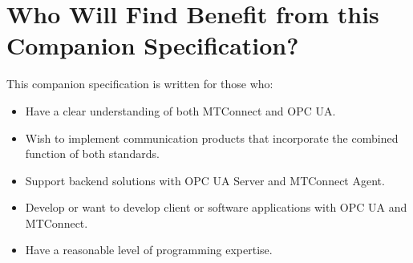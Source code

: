 \section{Who Will Find Benefit from this Companion Specification?}\label{whowillbenefit}

This companion specification is written for those who:
\begin{itemize}
    \item Have a clear understanding of both MTConnect and OPC UA.
    \item Wish to implement communication products that incorporate the combined function of both standards.
    \item Support backend solutions with OPC UA Server and MTConnect Agent.
    \item Develop or want to develop client or software applications with OPC UA and MTConnect.
    \item Have a reasonable level of programming expertise.
\end{itemize}
